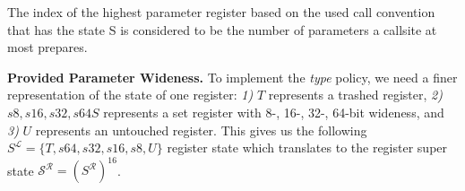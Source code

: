 %
%
%

The index of the highest parameter register based on the used call convention that has the state S is considered to be the number of parameters a callsite at most prepares.

\textbf{Provided Parameter Wideness.}
\label{subsection:providedparamwideness}
To implement the \emph{type} policy, we need a finer representation of the state of one register:
\textit{1)} $T$ represents a trashed register,
\textit{2)} $s8, s16, s32, s64 S$ represents a set register with  8-, 16-, 32-, 64-bit  wideness, and
\textit{3)} $U$ represents an untouched register.
This gives us the following $S^\mathcal{L} = \{ T, s64, s32, s16, s8, U \}$ register state which translates to the register 
super state $\mathcal{S}^\mathcal{R} = (S^\mathcal{R})^{16}$.

